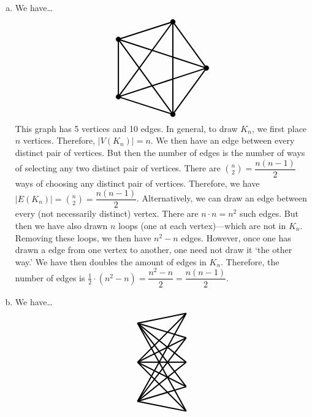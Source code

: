 \documentclass[11pt,letterpaper]{article}
\begin{document}
\sol 
\begin{enumerate}[(a)]
\item We have\dots
	\[
	\begin{tikzpicture}[scale=1]
	\draw[line width= 0.05cm] (2,0) -- (0.62,1.9) -- (-1.62,1.18) -- (-1.62,-1.18) -- (0.62,-1.9) -- (2,0);
	\draw[line width= 0.05cm] (2,0) -- (-1.62,1.18);
	\draw[line width= 0.05cm] (2,0) -- (-1.62,-1.18);
	\draw[line width= 0.05cm] (0.62,1.9) -- (-1.62,-1.18);
	\draw[line width= 0.05cm] (0.62,1.9) -- (0.62,-1.9);
	\draw[line width= 0.05cm] (-1.62,1.18) -- (0.62,-1.9);
	
	\draw[fill=black] (2,0) circle (0.1); 
	\draw[fill=black] (0.62,1.9) circle (0.1); 
	\draw[fill=black] (-1.62,1.18) circle (0.1); 
	\draw[fill=black] (-1.62,-1.18) circle (0.1); 
	\draw[fill=black] (0.62,-1.9) circle (0.1); 
	\end{tikzpicture}
	\]
This graph has 5 vertices and 10 edges. In general, to draw $K_n$, we first place $n$ vertices. Therefore, $|V(K_n)|= n$. We then have an edge between every distinct pair of vertices. But then the number of edges is the number of ways of selecting any two distinct pair of vertices. There are $\binom{n}{2}= \dfrac{n(n - 1)}{2}$ ways of choosing any distinct pair of vertices. Therefore, we have $|E(K_n)|= \binom{n}{2}= \dfrac{n(n - 1)}{2}$. Alternatively, we can draw an edge between every (not necessarily distinct) vertex. There are $n \cdot n= n^2$ such edges. But then we have also drawn $n$ loops (one at each vertex)---which are not in $K_n$. Removing these loops, we then have $n^2 - n$ edges. However, once one has drawn a edge from one vertex to another, one need not draw it `the other way.' We have then doubles the amount of edges in $K_n$. Therefore, the number of edges is $\frac{1}{2} \cdot (n^2- n)= \dfrac{n^2 - n}{2}= \dfrac{n(n - 1)}{2}$. 

\item We have\dots
	\[
	\begin{tikzpicture}[scale=1]
	\draw[line width= 0.05cm] (0,0.4) -- (2,0);
	\draw[line width= 0.05cm] (0,0.4) -- (2,1);
	\draw[line width= 0.05cm] (0,0.4) -- (2,2);
	\draw[line width= 0.05cm] (0,0.4) -- (2,3);
	\draw[line width= 0.05cm] (0,0.4) -- (2,4);
	\draw[line width= 0.05cm] (0,2.0) -- (2,0);
	\draw[line width= 0.05cm] (0,2.0) -- (2,1);
	\draw[line width= 0.05cm] (0,2.0) -- (2,2);
	\draw[line width= 0.05cm] (0,2.0) -- (2,3);
	\draw[line width= 0.05cm] (0,2.0) -- (2,4);
	\draw[line width= 0.05cm] (0,3.6) -- (2,0);
	\draw[line width= 0.05cm] (0,3.6) -- (2,1);
	\draw[line width= 0.05cm] (0,3.6) -- (2,2);
	\draw[line width= 0.05cm] (0,3.6) -- (2,3);
	\draw[line width= 0.05cm] (0,3.6) -- (2,4);
	

\end{tikzpicture}\]
\end{enumerate}
\end{document}
